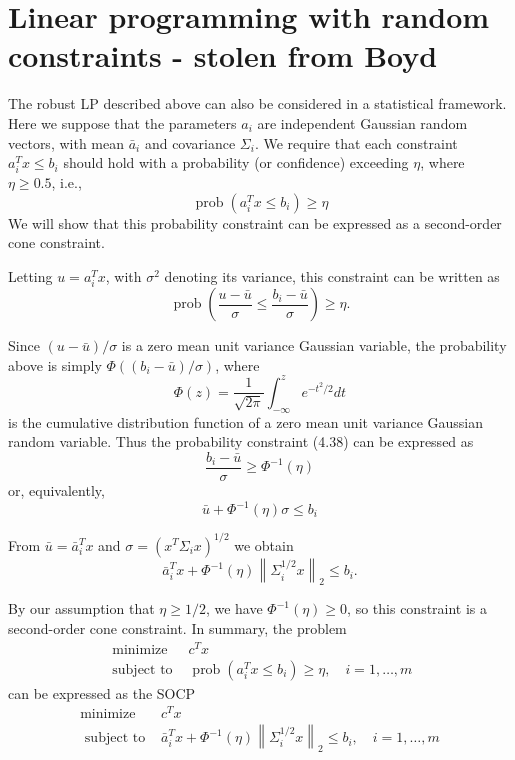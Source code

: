 

\section{Linear programming with random constraints - stolen from Boyd}
The robust LP described above can also be considered in a statistical framework. Here we suppose that the parameters $a_i$ are independent Gaussian random vectors, with mean $\bar{a}_i$ and covariance $\Sigma_i$. We require that each constraint $a_i^T x \leq b_i$ should hold with a probability (or confidence) exceeding $\eta$, where $\eta \geq 0.5$, i.e.,
$$
\operatorname{prob}\left(a_i^T x \leq b_i\right) \geq \eta
$$
We will show that this probability constraint can be expressed as a second-order cone constraint.

Letting $u=a_i^T x$, with $\sigma^2$ denoting its variance, this constraint can be written as
$$
\operatorname{prob}\left(\frac{u-\bar{u}}{\sigma} \leq \frac{b_i-\bar{u}}{\sigma}\right) \geq \eta .
$$

Since $(u-\bar{u}) / \sigma$ is a zero mean unit variance Gaussian variable, the probability above is simply $\Phi\left(\left(b_i-\bar{u}\right) / \sigma\right)$, where
$$
\Phi(z)=\frac{1}{\sqrt{2 \pi}} \int_{-\infty}^z e^{-t^2 / 2} d t
$$
is the cumulative distribution function of a zero mean unit variance Gaussian random variable. Thus the probability constraint (4.38) can be expressed as
$$
\frac{b_i-\bar{u}}{\sigma} \geq \Phi^{-1}(\eta)
$$
or, equivalently,
$$
\bar{u}+\Phi^{-1}(\eta) \sigma \leq b_i
$$

From $\bar{u}=\bar{a}_i^T x$ and $\sigma=\left(x^T \Sigma_i x\right)^{1 / 2}$ we obtain
$$
\bar{a}_i^T x+\Phi^{-1}(\eta)\left\|\Sigma_i^{1 / 2} x\right\|_2 \leq b_i .
$$

By our assumption that $\eta \geq 1 / 2$, we have $\Phi^{-1}(\eta) \geq 0$, so this constraint is a second-order cone constraint.
In summary, the problem
$$
\begin{array}{ll}
\text { minimize } & c^T x \\
\text { subject to } & \operatorname{prob}\left(a_i^T x \leq b_i\right) \geq \eta, \quad i=1, \ldots, m
\end{array}
$$
can be expressed as the SOCP
$$
\begin{array}{ll}
\operatorname{minimize} & c^T x \\
\text { subject to } & \bar{a}_i^T x+\Phi^{-1}(\eta)\left\|\Sigma_i^{1 / 2} x\right\|_2 \leq b_i, \quad i=1, \ldots, m
\end{array}
$$


